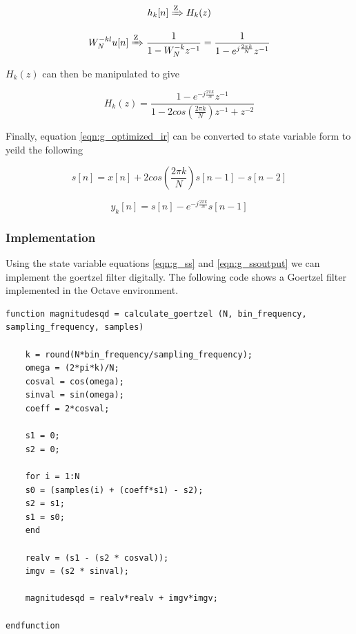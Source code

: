 \[h_k[n] \xRightarrow{\text{Z}} H_k(z)\]

\begin{equation}
W_N^{-kl}u[n] \xRightarrow{\text{Z}} \frac{1}{1 - W_N^{-k}z^{-1}} = \frac{1}{1 - e^{j\frac{2\pi k}{N}}z^{-1}}
\end{equation}

$H_k(z)$ can then be manipulated to give

\begin{equation}
\label{eqn:g_optimized_ir}
H_k(z) = \frac{1 - e^{-j\frac{2\pi k}{N}}z^{-1}}{1 - 2cos(\frac{2\pi k}{N})z^{-1} + z^{-2}}
\end{equation}

Finally, equation \ref{eqn:g_optimized_ir} can be converted to state variable form to yeild the following


\begin{equation}
	\label{eqn:g_ss}
	s[n] = x[n]+2cos(\frac{2\pi k}{N})s[n-1]-s[n-2]
\end{equation}


\begin{equation}
	\label{eqn:g_ssoutput}
	y_k[n] = s[n]-e^{-j\frac{2\pi k}{N}}s[n-1]
\end{equation}



\subsubsection{Implementation}
Using the state variable equations \ref{eqn:g_ss} and \ref{eqn:g_ssoutput} we can implement the goertzel filter digitally. The following code shows a Goertzel filter implemented in the Octave environment.

\begin{lstlisting}
function magnitudesqd = calculate_goertzel (N, bin_frequency, sampling_frequency, samples)

	k = round(N*bin_frequency/sampling_frequency);
	omega = (2*pi*k)/N;
	cosval = cos(omega);
	sinval = sin(omega);
	coeff = 2*cosval;
	
	s1 = 0;
	s2 = 0;
	
	for i = 1:N
	s0 = (samples(i) + (coeff*s1) - s2);
	s2 = s1;
	s1 = s0;    
	end
	
	realv = (s1 - (s2 * cosval));
	imgv = (s2 * sinval);  
	
	magnitudesqd = realv*realv + imgv*imgv;

endfunction
\end{lstlisting}

